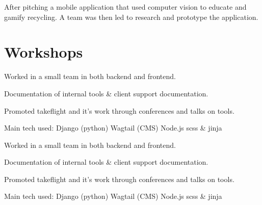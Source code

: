 \documentclass[a4paper]{deedy-resume} %
\begin{document}
\begin{minipage}[t]{0.66\textwidth}
\sectionspace %



After pitching a mobile application that used computer vision to educate and gamify recycling. %
A team was then led to research and prototype the application. %

\sectionspace %

\sectionspace
\section{Workshops}


\vspace{\topsep} %
\begin{tightitemize}
\item Worked in a small team in both backend and frontend.
\item Documentation of internal tools \& client support documentation.
\item Promoted takeflight and it's work through conferences and talks on tools.
\end{tightitemize}
Main tech used: \textbullet{} Django (python) \textbullet{} Wagtail (CMS) \textbullet{} Node.js \textbullet{} scss \& jinja

\sectionspace %



\vspace{\topsep} %
\begin{tightitemize}
\item Worked in a small team in both backend and frontend.
\item Documentation of internal tools \& client support documentation.
\item Promoted takeflight and it's work through conferences and talks on tools.
\end{tightitemize}
Main tech used: \textbullet{} Django (python) \textbullet{} Wagtail (CMS) \textbullet{} Node.js \textbullet{} scss \& jinja


\end{minipage}
\end{document}
